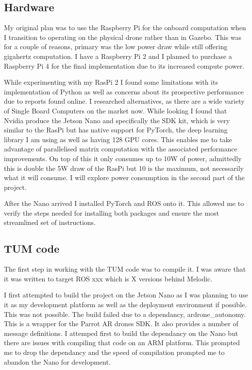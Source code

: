 \documentclass[]{../resources/final_report}
\begin{document}

\subsection{Hardware}

My original plan was to use the Raspberry Pi for the onboard computation when I transition to operating on the physical drone rather than in Gazebo.
This was for a couple of reasons, primary was the low power draw while still offering gigahertz computation. I have a Raspberry Pi 2 and I planned to purchase a Raspberry Pi 4 for the final implementation due to its increased compute power.

While experimenting with my RasPi 2 I found some limitations with its implementation of Python as well as concerns about its prospective performance due to reports found online.
I researched alternatives, as there are a wide variety of Single Board Computers on the market now. While looking I found that Nvidia produce the Jetson Nano and specifically the SDK kit, which is very similar to the RasPi but has native support for PyTorch, the deep learning library I am using as well as having 128 GPU cores.
This enables me to take advantage of parallelised matrix computation with the associated performance improvements. On top of this it only consumes up to 10W of power, admittedly this is double the 5W draw of the RasPi but 10 is the maximum, not necessarily what it will consume. I will explore power consumption in the second part of the project.

After the Nano arrived I installed PyTorch and ROS onto it. This allowed me to verify the steps needed for installing both packages and ensure the most streamlined set of instructions.


\subsection{TUM code}

The first step in working with the TUM code was to compile it. I was aware that it was written to target ROS xxx which is X versions behind Melodic.

I first attempted to build the project on the Jetson Nano as I was planning to use it as my development platform as well as the deployment environment if possible.
This was not possible. The build failed due to a dependancy, ardrone\_autonomy. This is a wrapper for the Parrot AR drones SDK. It also provides a number of message definitions.
I attemped first to build the dependancy on the Nano but there are issues with compiling that code on an ARM platform. This prompted me to drop the dependancy and the speed of compilation prompted me to abandon the Nano for development.
\end{document}

